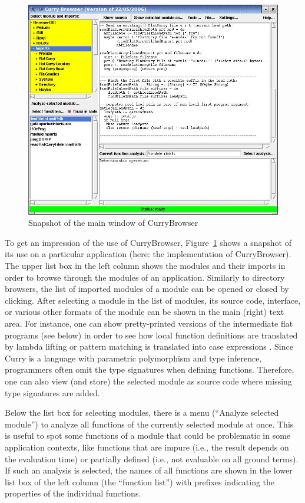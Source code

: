 \documentclass[11pt,fleqn]{article}
\newcommand{\cb}{CurryBrowser\xspace}
\begin{document}
\begin{figure}[t]
\begin{center}
 \includegraphics[scale=0.7]{currybrowser.jpg}
\end{center}
\caption{Snapshot of the main window of CurryBrowser\label{fig-currybrowser}}
\end{figure}
%
To get an impression of the use of \cb, Figure~\ref{fig-currybrowser}
shows a snapshot of its use on a particular application
(here: the implementation of \cb).
The upper list box in the left column shows the modules and their imports
in order to browse through the modules of an application.
Similarly to directory browsers, the list of imported modules of a module
can be opened or closed by clicking.
After selecting a module in the list of modules, its source code,
interface, or various other formats of the module can be shown
in the main (right) text area. For instance, one can show
pretty-printed versions of the intermediate flat programs (see below)
in order to see how local function definitions are translated by lambda lifting
\cite{Johnsson85}
or pattern matching is translated into case expressions \cite{Hanus97POPL,Wadler87}.
Since Curry is a language with parametric polymorphism and type inference,
programmers often omit the type signatures when defining functions.
Therefore, one can also view (and store) the selected module as source code where
missing type signatures are added.

Below the list box for selecting modules, there is a menu
(``Analyze selected module'') to analyze all functions
of the currently selected module at once. This is useful
to spot some functions of a module that could be problematic
in some application contexts, like functions that are impure (i.e., the result
depends on the evaluation time) or partially defined (i.e.,
not evaluable on all ground terms).
If such an analysis is selected,
the names of all functions are shown in the
lower list box of the left column (the ``function list'')
with prefixes indicating the properties of the individual functions.
\end{document}
